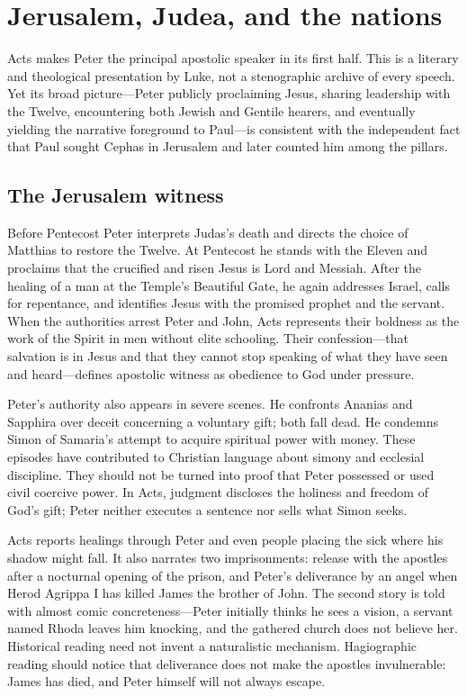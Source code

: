 \section{Jerusalem, Judea, and the nations}\label{sec:peter-acts}

Acts makes Peter the principal apostolic speaker in its first half. This is a
literary and theological presentation by Luke, not a stenographic archive of
every speech. Yet its broad picture---Peter publicly proclaiming Jesus,
sharing leadership with the Twelve, encountering both Jewish and Gentile
hearers, and eventually yielding the narrative foreground to Paul---is
consistent with the independent fact that Paul sought Cephas in Jerusalem
and later counted him among the pillars.

\subsection{The Jerusalem witness}

Before Pentecost Peter interprets Judas's death and directs the choice of
Matthias to restore the Twelve. At Pentecost he stands with the Eleven and
proclaims that the crucified and risen Jesus is Lord and Messiah. After the
healing of a man at the Temple's Beautiful Gate, he again addresses Israel,
calls for repentance, and identifies Jesus with the promised prophet and the
servant. When the authorities arrest Peter and John, Acts represents their
boldness as the work of the Spirit in men without elite schooling. Their
confession---that salvation is in Jesus and that they cannot stop speaking of
what they have seen and heard---defines apostolic witness as obedience to God
under pressure.

Peter's authority also appears in severe scenes. He confronts Ananias and
Sapphira over deceit concerning a voluntary gift; both fall dead. He condemns
Simon of Samaria's attempt to acquire spiritual power with money. These
episodes have contributed to Christian language about simony and ecclesial
discipline. They should not be turned into proof that Peter possessed or used
civil coercive power. In Acts, judgment discloses the holiness and freedom of
God's gift; Peter neither executes a sentence nor sells what Simon seeks.

Acts reports healings through Peter and even people placing the sick where his
shadow might fall. It also narrates two imprisonments: release with the
apostles after a nocturnal opening of the prison, and Peter's deliverance by
an angel when Herod Agrippa I has killed James the brother of John. The second
story is told with almost comic concreteness---Peter initially thinks he sees
a vision, a servant named Rhoda leaves him knocking, and the gathered church
does not believe her. Historical reading need not invent a naturalistic
mechanism. Hagiographic reading should notice that deliverance does not make
the apostles invulnerable: James has died, and Peter himself will not always
escape.

